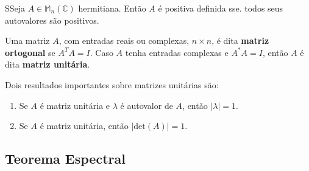 \documentclass[12pt,a4paper]{article}
\begin{document}
\begin{teorema}{}
 SSeja $A \in \mathbb{M}_n(\mathbb{C})$ hermitiana. Então $A$ é positiva definida sse. todos seus autovalores são positivos.
\end{teorema}

Uma matriz $A$, com entradas reais ou complexas, $n \times n$, é dita \textbf{matriz ortogonal} se $A^T A = I$. Caso $A$ tenha entradas complexas e $A^{\ast} A = I$, então $A$ é dita \textbf{matriz unitária}.

Dois resultados importantes sobre matrizes unitárias são:

\begin{enumerate}
\item Se $A$ é matriz unitária e $\lambda$ é autovalor de $A$, então $| \lambda | = 1$.
\item Se $A$ é matriz unitária, então $| \text{det}(A) | = 1$.
\end{enumerate}

\subsection{Teorema Espectral}


\nocite{*}


\end{document}
